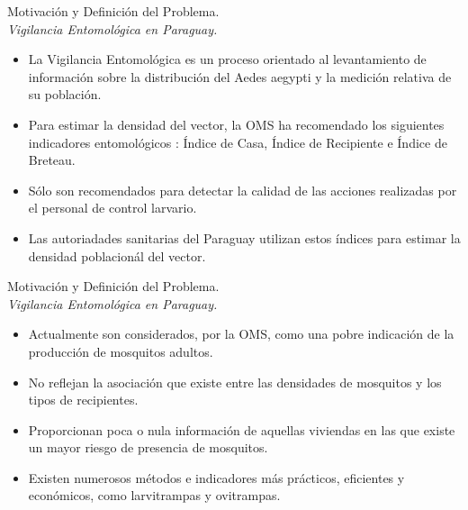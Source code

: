 
\begin{frame}[c]{Motivación y Definición del Problema.\\\textit{Vigilancia Entomológica en Paraguay.}}

    \begin{itemize}
      \item La Vigilancia Entomológica es un proceso orientado al levantamiento de información sobre la distribución del Aedes aegypti y la medición relativa de su población.

      \item Para estimar la densidad del vector, la OMS ha recomendado los siguientes indicadores entomológicos : Índice de Casa, Índice de Recipiente e Índice de Breteau.

      \item Sólo son recomendados para detectar la calidad de las acciones realizadas por el personal de control larvario.

      \item Las autoriadades sanitarias del Paraguay utilizan estos índices para estimar la densidad poblacionál del vector.

    \end{itemize}
\end{frame}

\begin{frame}[c]{Motivación y Definición del Problema.\\\textit{Vigilancia Entomológica en Paraguay.}}
\begin{itemize}
      \item Actualmente son considerados, por la OMS, como una pobre indicación de la producción de mosquitos adultos.

      \item No reflejan la asociación que existe entre las densidades de mosquitos y los tipos de recipientes.

      \item Proporcionan poca o nula información de aquellas viviendas en las que existe un mayor riesgo de presencia de mosquitos.

      \item Existen numerosos métodos e indicadores más prácticos, eficientes y económicos, como larvitrampas y ovitrampas.

    \end{itemize}
\end{frame}

